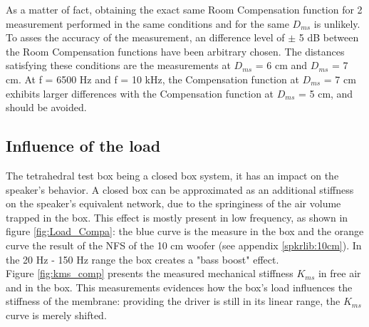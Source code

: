 \documentclass{report}
\begin{document}
As a matter of fact, obtaining the exact same Room Compensation function for 2 measurement performed in the same conditions and for the same $D_{ms}$ is unlikely. \\
To asses the accuracy of the measurement, an difference level of $\pm$ 5 dB between the Room Compensation functions have been arbitrary chosen. The distances satisfying these conditions are the measurements at $D_{ms}$ = 6 cm and $D_{ms}$ = 7 cm. At f = 6500 Hz and f = 10 kHz, the Compensation function at $D_{ms}$ = 7 cm exhibits larger differences with the Compensation function at $D_{ms}$ = 5 cm, and should be avoided. 

\subsection{Influence of the load}
\label{sec:load}

The tetrahedral test box being a closed box system, it has an impact on the speaker's behavior. A closed box can be approximated as an additional  stiffness on the speaker's equivalent network, due to the springiness of the air volume trapped in the box. This effect is mostly present in low frequency, as shown in figure \ref{fig:Load_Compa}: the blue curve is the measure in the box and the orange curve the result of the NFS of the 10 cm woofer (see appendix \ref{spkrlib:10cm}). In the 20 Hz - 150 Hz range the box creates a "bass boost" effect. \\
Figure \ref{fig:kms_comp} presents the measured mechanical stiffness $K_{ms}$ in free air and in the box. This measurements evidences how the box's load influences the stiffness of the membrane: providing the driver is still in its linear range, the $K_{ms}$ curve is merely shifted. \\ 
\end{document}
